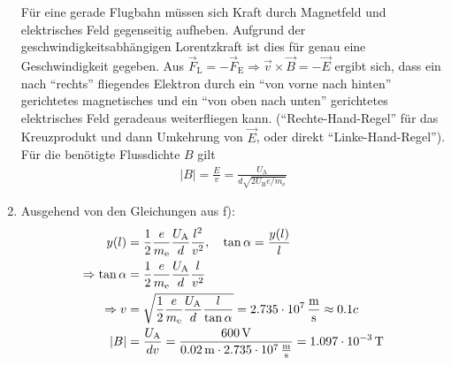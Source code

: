 \documentclass[a4paper]{scrartcl}
\begin{document}
\begin{enumerate}[noitemsep]
    Für eine gerade Flugbahn müssen sich Kraft durch Magnetfeld und elektrisches Feld gegenseitig aufheben. Aufgrund der geschwindigkeitsabhängigen Lorentzkraft ist dies für genau eine Geschwindigkeit gegeben. Aus $\vec F_\text{L} = -\vec F_\text{E} \Rightarrow \vec v \times \vec B = - \vec E$ ergibt sich, dass ein nach "`rechts"' fliegendes Elektron durch ein "`von vorne nach hinten"' gerichtetes magnetisches und ein "`von oben nach unten"' gerichtetes elektrisches Feld geradeaus weiterfliegen kann. ("`Rechte-Hand-Regel"' für das Kreuzprodukt und dann Umkehrung von $\vec E$, oder direkt "`Linke-Hand-Regel"'). Für die benötigte Flussdichte $B$ gilt 
    \begin{align*}
      |B| = \frac{E}{v} = \frac{U_\text{A}}{d\sqrt{2U_\text{B}e/m_\text{e}}}
    \end{align*}
  \item Ausgehend von den Gleichungen aus f):
    \begin{align*}
      y(l) &= \frac{1}{2}\frac{e}{m_\text{e}} \frac{U_\text{A}}{d} \frac{l^2}{v^2}, \quad \tan\alpha = \frac{y(l)}{l}\\
      \Rightarrow \tan \alpha & =  \frac{1}{2}\frac{e}{m_\text{e}} \frac{U_\text{A}}{d} \frac{l}{v^2}\\
      \Rightarrow v & = \sqrt { \frac{1}{2}\frac{e}{m_\text{e}} \frac{U_\text{A}}{d} \frac{l}{\tan \alpha}} = \unit[2.735 \cdot 10^7]{\frac{m}{s}} \approx 0.1c\\
      |B| & = \frac{U_\text{A}}{dv} = \frac{\unit[600]{V}}{\unit[0.02]{m} \cdot \unit[2.735 \cdot 10^7]{\frac{m}{s}}} = \unit[1.097 \cdot 10^{-3}]{T}
    \end{align*}
\end{enumerate}
\end{document}
